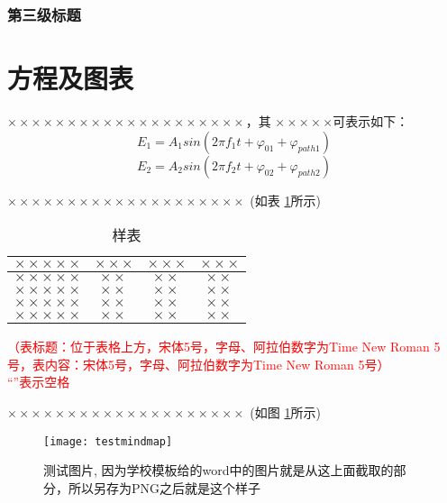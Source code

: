 \documentclass[11pt,a4paper]{article}
\theoremstyle{definition} \newtheorem{law}[thm]{Law}
\theoremstyle{plain} \newtheorem{jury}[thm]{Jury}
\theoremstyle{remark} \newtheorem*{marg}{Margaret}
\newcommand{\reffig}[1]{图 \ref{#1}}
\newcommand{\reftab}[1]{表 \ref{#1}}
\numberwithin{equation}{section}
\begin{document}
\subsubsection{第三级标题}



\section{方程及图表}
$ \times\times\times\times\times\times\times\times\times\times\times\times\times\times\times\times\times\times\times\times $，其 $ \times\times\times\times\times$可表示如下：
\begin{equation}
	E_{1}=A_{1}sin\!\left(2\pi f_{1}t+\varphi_{01}+\varphi_{path1} \right)
\end{equation}
\begin{equation}
	E_{2}=A_{2}sin\!\left(2\pi f_{2}t+\varphi_{02}+\varphi_{path2} \right)
\end{equation}

$ \times\times\times\times\times\times\times\times\times\times\times\times\times\times\times\times\times\times\times\times $  (如\reftab{table1}所示)

\begin{table}[htpb]
	\centering
	\caption{样表}
	\label{table1}
	\begin{tabular}{cccc}
		\toprule
		$ \times\times\times\times\times $ & $ \times\times\times $ & $ \times\times\times $ & $ \times\times\times $ \\
		\hline
		$ \times\times\times\times\times $ & $ \times\times $       & $ \times\times $       & $ \times\times $       \\
		$ \times\times\times\times\times $ & $ \times\times $       & $ \times\times $       & $ \times\times $       \\
		$ \times\times\times\times\times $ & $ \times\times $       & $ \times\times $       & $ \times\times $       \\ 	    	\cline{2-4}
		$ \times\times\times\times\times $ & $ \times\times $       & $ \times\times $       & $ \times\times $       \\
		\bottomrule
	\end{tabular}
\end{table}
\textcolor{red}{（表标题：位于表格上方，宋体5号，字母、阿拉伯数字为Time New Roman 5号，表内容：宋体5号，字母、阿拉伯数字为Time New Roman 5号）\\ ``\fbox{\phantom{a}}''表示空格}

$ \times\times\times\times\times\times\times\times\times\times\times\times\times\times\times\times\times\times\times\times $  (如\reffig{testfig}所示)
\begin{figure}[htbp]
	\centering
	\texttt{[image: testmindmap]}
	\caption{测试图片, 因为学校模板给的word中的图片就是从这上面截取的部分，所以另存为PNG之后就是这个样子}
	\label{testfig}
\end{figure}
\end{document}

